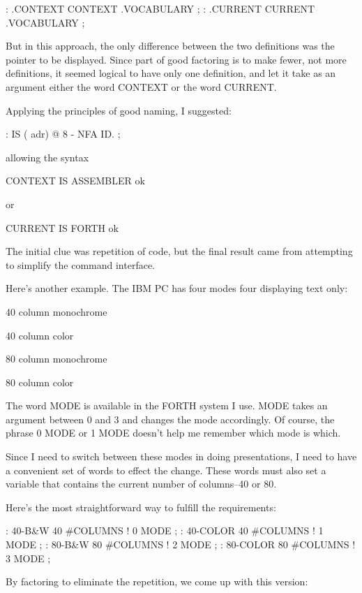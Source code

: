 \begin{Code}
: .CONTEXT   CONTEXT .VOCABULARY ;
: .CURRENT   CURRENT .VOCABULARY ;
\end{Code}
But in this approach, the only difference between the two definitions was the pointer to be displayed. Since part of good factoring is to make fewer, not more definitions, it seemed logical to have only one definition, and let it take as an argument either the word CONTEXT or the word CURRENT.

Applying the principles of good naming, I suggested:

\begin{Code}
: IS  ( adr)   @  8 -  NFA  ID. ;
\end{Code}
allowing the syntax

\begin{Code}
CONTEXT IS ASSEMBLER ok
\end{Code}
or

\begin{Code}
CURRENT IS FORTH ok
\end{Code}
The initial clue was repetition of code, but the final result came from attempting to simplify the command interface.

Here's another example. The IBM PC has four modes four displaying text only:

\bigskip

40 column monochrome

40 column color

80 column monochrome

80 column color

\bigskip

\noindent
The word MODE is available in the FORTH system I use. MODE takes an argument between 0 and 3 and changes the mode accordingly. Of course, the phrase 0 MODE or 1 MODE doesn't help me remember which mode is which.

Since I need to switch between these modes in doing presentations, I need to have a convenient set of words to effect the change. These words must also set a variable that contains the current number of columns--40 or 80.

Here's the most straightforward way to fulfill the requirements:

\begin{Code}
: 40-B&W       40 #COLUMNS !  0 MODE ;
: 40-COLOR     40 #COLUMNS !  1 MODE ;
: 80-B&W       80 #COLUMNS !  2 MODE ;
: 80-COLOR     80 #COLUMNS !  3 MODE ;
\end{Code}
By factoring to eliminate the repetition, we come up with this version:

